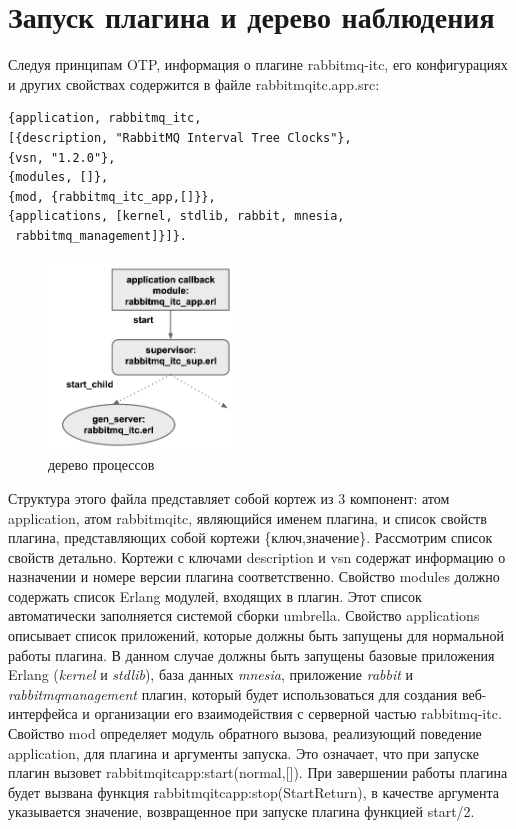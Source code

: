 \section{Запуск плагина и дерево наблюдения}
Следуя принципам OTP, информация о плагине rabbitmq-itc, его конфигурациях и других свойствах содержится в файле rabbitmq\underline{\hspace{0.25cm}}itc.app.src:
\begin{lstlisting}
{application, rabbitmq_itc,
[{description, "RabbitMQ Interval Tree Clocks"},
{vsn, "1.2.0"},
{modules, []},
{mod, {rabbitmq_itc_app,[]}},
{applications, [kernel, stdlib, rabbit, mnesia,
 rabbitmq_management]}]}.
\end{lstlisting}
\begin{figure}
\centering
\includegraphics[width=0.45\textwidth]{img/sup.png}
\caption{дерево процессов}
\end{figure}
Структура этого файла представляет собой кортеж из 3 компонент: атом application, атом rabbitmq\underline{\hspace{0.25cm}}itc, являющийся именем плагина, и список свойств плагина, представляющих собой кортежи \{ключ,значение\}. Рассмотрим список свойств детально. Кортежи с ключами description и vsn содержат информацию о назначении и номере версии плагина соответственно. Свойство modules должно содержать список Erlang модулей, входящих в плагин. Этот список автоматически заполняется системой сборки umbrella. Свойство applications описывает список приложений, которые должны быть запущены для нормальной работы плагина. В данном случае должны быть запущены базовые приложения Erlang (\textit{kernel} и \textit{stdlib}), база данных \textit{mnesia}, приложение \textit{rabbit} и \textit{rabbitmq\underline{\hspace{0.25cm}}management} плагин, который будет использоваться для создания веб-интерфейса и организации его взаимодействия с серверной частью rabbitmq-itc. Свойство mod определяет модуль обратного вызова, реализующий поведение application, для плагина и аргументы запуска. Это означает, что при запуске плагин вызовет rabbitmq\underline{\hspace{0.25cm}}itc\underline{\hspace{0.25cm}}app:start(normal,[]). При завершении работы плагина будет вызвана функция rabbitmq\underline{\hspace{0.25cm}}itc\underline{\hspace{0.25cm}}app:stop(StartReturn), в качестве аргумента указывается значение, возвращенное при запуске плагина функцией start/2.\par 
